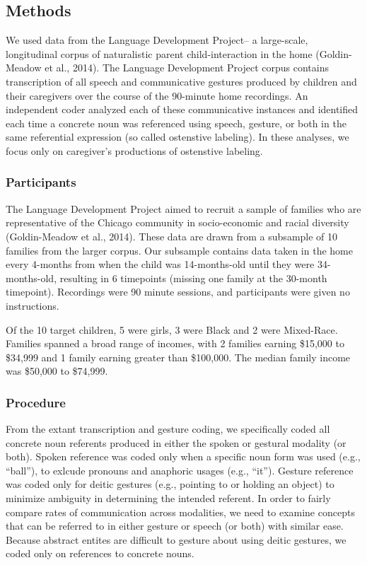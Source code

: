 \documentclass[english,,man,floatsintext]{apa6}
\begin{document}
\hypertarget{methods}{%
\subsection{Methods}\label{methods}}

We used data from the Language Development Project-- a large-scale, longitudinal corpus of naturalistic parent child-interaction in the home (Goldin-Meadow et al., 2014). The Language Development Project corpus contains transcription of all speech and communicative gestures produced by children and their caregivers over the course of the 90-minute home recordings. An independent coder analyzed each of these communicative instances and identified each time a concrete noun was referenced using speech, gesture, or both in the same referential expression (so called ostenstive labeling). In these analyses, we focus only on caregiver's productions of ostenstive labeling.

\hypertarget{participants}{%
\subsubsection{Participants}\label{participants}}

The Language Development Project aimed to recruit a sample of families who are representative of the Chicago community in socio-economic and racial diversity (Goldin-Meadow et al., 2014). These data are drawn from a subsample of 10 families from the larger corpus. Our subsample contains data taken in the home every 4-months from when the child was 14-months-old until they were 34-months-old, resulting in 6 timepoints (missing one family at the 30-month timepoint). Recordings were 90 minute sessions, and participants were given no instructions.

Of the 10 target children, 5 were girls, 3 were Black and 2 were Mixed-Race. Families spanned a broad range of incomes, with 2 families earning \$15,000 to \$34,999 and 1 family earning greater than \$100,000. The median family income was \$50,000 to \$74,999.

\hypertarget{procedure}{%
\subsubsection{Procedure}\label{procedure}}

From the extant transcription and gesture coding, we specifically coded all concrete noun referents produced in either the spoken or gestural modality (or both). Spoken reference was coded only when a specific noun form was used (e.g., \enquote{ball}), to exlcude pronouns and anaphoric usages (e.g., \enquote{it}). Gesture reference was coded only for deitic gestures (e.g., pointing to or holding an object) to minimize ambiguity in determining the intended referent. In order to fairly compare rates of communication across modalities, we need to examine concepts that can be referred to in either gesture or speech (or both) with similar ease. Because abstract entites are difficult to gesture about using deitic gestures, we coded only on references to concrete nouns.
\end{document}
